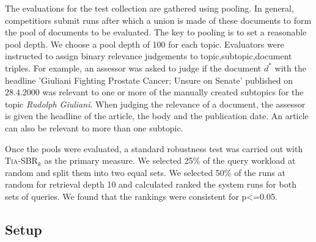 The evaluations for the test collection are gathered using pooling. In general, competitiors submit runs after which a union is made of these documents to form the pool of documents to be evaluated. The key to pooling is to set a reasonable pool depth. We choose a pool depth of 100 for each topic. Evaluators were instructed to assign binary relevance judgements to topic,subtopic,document triples. For example, an assessor was asked to judge if the document $d^*$ with the headline 'Giuliani Fighting Prostate Cancer; Unsure on Senate' published on $28.4.2000$ was relevant to one or more of the manually created subtopics for the topic \emph{Rudolph Giuliani}. When judging the relevance of a document, the assessor is given the headline of the article, the body and the publication date. An article can also be relevant to more than one subtopic.

Once the pools were evaluated, a standard robustness test was carried out with \textsc{Tia-SBR}$_k$ as the primary measure. We selected 25\% of the query workload at random and split them into two equal sets. We selected 50\% of the runs at random for retrieval depth 10 and calculated ranked the system runs for both sets of queries. We found that the rankings were consistent for p<=0.05.
\subsection{Setup} %
\label{sub:subsection_name}


